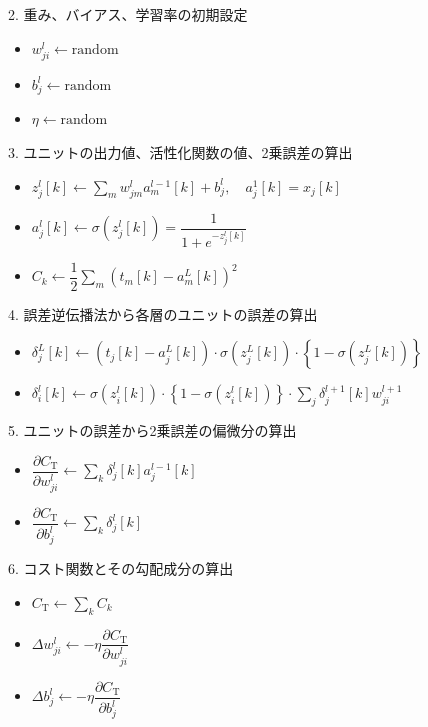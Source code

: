 \documentclass[dvipdfmx,aspectratio=169]{beamer}
\begin{document}
	\begin{frame}{2. 重み、バイアス、学習率の初期設定}
		\begin{itemize}
			\item $ w^l_{ji} \longleftarrow \mathrm{random} $
			\item $ b^l_j \longleftarrow \mathrm{random} $
			\item $ \eta \longleftarrow \mathrm{random} $
		\end{itemize}
	\end{frame}
	\begin{frame}{3. ユニットの出力値、活性化関数の値、2乗誤差の算出}
		\begin{itemize}
			\item $ z^l_j[k] \longleftarrow \displaystyle\sum_m w^l_{jm}a^{l-1}_m[k] + b^l_j,\quad a^1_j[k] = x_j[k] $
			\item $ a^l_j[k] \longleftarrow \sigma(z^l_j[k]) = \dfrac{1}{1 + e^{-z^l_j[k]}} $
			\item $ C_k \longleftarrow \dfrac{1}{2} \displaystyle\sum_m \left( t_m[k] - a^L_m[k] \right)^2 $
		\end{itemize}
	\end{frame}
	\begin{frame}{4. 誤差逆伝播法から各層のユニットの誤差の算出}
		\begin{itemize}
			\item $ \delta^L_j[k] \longleftarrow (t_j[k] - a^L_j[k]) \cdot \sigma(z^L_j[k]) \cdot\left\lbrace 1 - \sigma(z^L_j[k]) \right\rbrace $
			\item $ \delta^l_i[k] \longleftarrow \sigma(z^l_i[k]) \cdot \left\lbrace 1 - \sigma(z^l_i[k]) \right\rbrace \cdot \displaystyle\sum_j \delta^{l+1}_j[k] w^{l+1}_{ji} $
		\end{itemize}
	\end{frame}
	\begin{frame}{5. ユニットの誤差から2乗誤差の偏微分の算出}
		\begin{itemize}
			\item $ \dfrac{\partial C_\mathrm{T}}{\partial w^l_{ji}} \longleftarrow \displaystyle\sum_k \delta^l_j[k] a^{l-1}_j[k] $
			\item $ \dfrac{\partial C_\mathrm{T}}{\partial b^l_j} \longleftarrow \displaystyle\sum_k \delta^l_j[k] $
		\end{itemize}
	\end{frame}
	\begin{frame}{6. コスト関数とその勾配成分の算出}
		\begin{itemize}
			\item $ C_\mathrm{T} \longleftarrow \displaystyle\sum_k C_k $
			\item $ \Delta w^l_{ji} \longleftarrow -\eta \dfrac{\partial C_\mathrm{T}}{\partial w^l_{ji}} $
			\item $ \Delta b^l_j \longleftarrow -\eta \dfrac{\partial C_\mathrm{T}}{\partial b^l_j} $
		\end{itemize}
	\end{frame}
\end{document}
